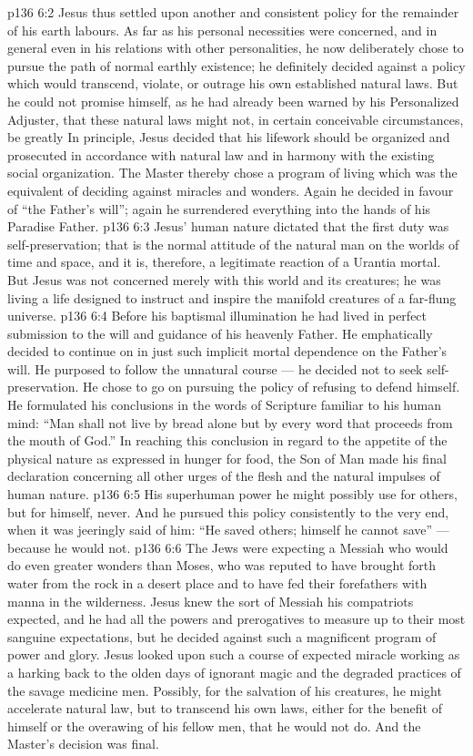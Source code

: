 \vs p136 6:2 Jesus thus settled upon another and consistent policy for the remainder of his earth labours. As far as his personal necessities were concerned, and in general even in his relations with other personalities, he now deliberately chose to pursue the path of normal earthly existence; he definitely decided against a policy which would transcend, violate, or outrage his own established natural laws. But he could not promise himself, as he had already been warned by his Personalized Adjuster, that these natural laws might not, in certain conceivable circumstances, be greatly  In principle, Jesus decided that his lifework should be organized and prosecuted in accordance with natural law and in harmony with the existing social organization. The Master thereby chose a program of living which was the equivalent of deciding against miracles and wonders. Again he decided in favour of “the Father’s will”; again he surrendered everything into the hands of his Paradise Father.
\vs p136 6:3 Jesus’ human nature dictated that the first duty was self\hyp{}preservation; that is the normal attitude of the natural man on the worlds of time and space, and it is, therefore, a legitimate reaction of a Urantia mortal. But Jesus was not concerned merely with this world and its creatures; he was living a life designed to instruct and inspire the manifold creatures of a far\hyp{}flung universe.
\vs p136 6:4 Before his baptismal illumination he had lived in perfect submission to the will and guidance of his heavenly Father. He emphatically decided to continue on in just such implicit mortal dependence on the Father’s will. He purposed to follow the unnatural course --- he decided not to seek self\hyp{}preservation. He chose to go on pursuing the policy of refusing to defend himself. He formulated his conclusions in the words of Scripture familiar to his human mind: “Man shall not live by bread alone but by every word that proceeds from the mouth of God.” In reaching this conclusion in regard to the appetite of the physical nature as expressed in hunger for food, the Son of Man made his final declaration concerning all other urges of the flesh and the natural impulses of human nature.
\vs p136 6:5 His superhuman power he might possibly use for others, but for himself, never. And he pursued this policy consistently to the very end, when it was jeeringly said of him: “He saved others; himself he cannot save” --- because he would not.
\vs p136 6:6 The Jews were expecting a Messiah who would do even greater wonders than Moses, who was reputed to have brought forth water from the rock in a desert place and to have fed their forefathers with manna in the wilderness. Jesus knew the sort of Messiah his compatriots expected, and he had all the powers and prerogatives to measure up to their most sanguine expectations, but he decided against such a magnificent program of power and glory. Jesus looked upon such a course of expected miracle working as a harking back to the olden days of ignorant magic and the degraded practices of the savage medicine men. Possibly, for the salvation of his creatures, he might accelerate natural law, but to transcend his own laws, either for the benefit of himself or the overawing of his fellow men, that he would not do. And the Master’s decision was final.

